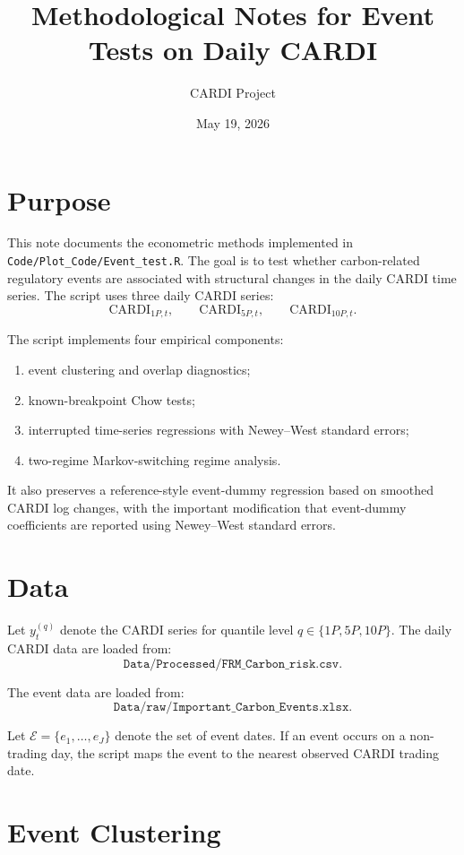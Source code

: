\documentclass[11pt]{article}
\title{Methodological Notes for Event Tests on Daily CARDI}
\author{CARDI Project}
\date{May 19, 2026}
\begin{document}
\maketitle

\section{Purpose}

This note documents the econometric methods implemented in
\texttt{Code/Plot\_Code/Event\_test.R}. The goal is to test whether
carbon-related regulatory events are associated with structural changes in the
daily CARDI time series. The script uses three daily CARDI series:
\[
\text{CARDI}_{1P,t}, \qquad \text{CARDI}_{5P,t}, \qquad \text{CARDI}_{10P,t}.
\]

The script implements four empirical components:
\begin{enumerate}
  \item event clustering and overlap diagnostics;
  \item known-breakpoint Chow tests;
  \item interrupted time-series regressions with Newey--West standard errors;
  \item two-regime Markov-switching regime analysis.
\end{enumerate}

It also preserves a reference-style event-dummy regression based on smoothed
CARDI log changes, with the important modification that event-dummy coefficients
are reported using Newey--West standard errors.

\section{Data}

Let \( y_t^{(q)} \) denote the CARDI series for quantile level
\(q \in \{1P,5P,10P\}\). The daily CARDI data are loaded from:
\[
\texttt{Data/Processed/FRM\_Carbon\_risk.csv}.
\]

The event data are loaded from:
\[
\texttt{Data/raw/Important\_Carbon\_Events.xlsx}.
\]

Let \( \mathcal{E} = \{e_1,\ldots,e_J\} \) denote the set of event dates.
If an event occurs on a non-trading day, the script maps the event to the
nearest observed CARDI trading date.

\section{Event Clustering}
\end{document}
